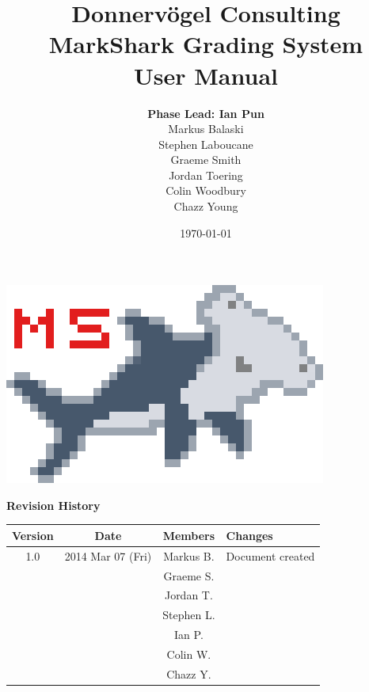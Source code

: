 \documentclass{article}
\begin{document}
\title{Donnervögel Consulting \\ MarkShark Grading System \\ User Manual}
\author{\textbf{Phase Lead: Ian Pun} \\ Markus Balaski \\ Stephen Laboucane \\
  Graeme Smith \\ Jordan Toering \\  Colin Woodbury \\ Chazz Young}
\date{\today}
\maketitle
\centerline{\includegraphics{../images/logo/markshark-10x}}
\clearpage

\textbf{Revision History}
\begin{center}
  \begin{tabular}{| c | c | c | l |}
    \hline
    Version & Date & Members & Changes\\
    \hline
    1.0 & 2014 Mar 07 (Fri) & Markus B. & Document created\\
    & & Graeme S. & \\
    & & Jordan T. & \\
    & & Stephen L. & \\
    & & Ian P. & \\
    & & Colin W. & \\
    & & Chazz Y. & \\
    \hline
  \end{tabular}
\end{center}
\clearpage

\tableofcontents
\clearpage
\end{document}
